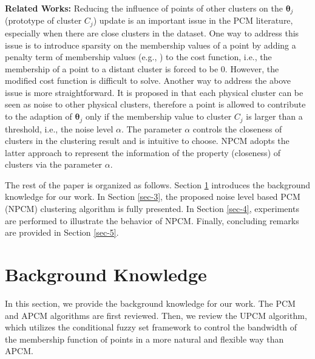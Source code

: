\documentclass[conference]{IEEEtran}
\theoremstyle{definition}
\begin{document}
\textbf{Related Works:}
Reducing the influence of points of other clusters on the $\boldsymbol{\theta}_j$ (prototype of cluster $C_j$) update is an important issue in the PCM literature, especially when there are close clusters in the dataset. One way to address this issue is to introduce sparsity on the membership values of a point by adding a penalty term of membership values (e.g., \cite{inokuchi_sparse_2007}\cite{xenaki_sparsity-aware_2016}) to the cost function, i.e., the membership of a point to a distant cluster is forced to be $0$. However, the modified cost function is difficult to solve. Another way to address the above issue is more straightforward. It is proposed in \cite{hou_pcm_2016} that each physical cluster can be seen as noise to other physical clusters, therefore a point is allowed to contribute to the adaption of $\boldsymbol{\theta}_j$ only if the membership value to cluster $C_j$ is larger than a threshold, i.e., the noise level $\alpha$. The parameter $\alpha$ controls the closeness of clusters in the clustering result and is intuitive to choose. NPCM adopts the latter approach to represent the information of the property (closeness) of clusters via the parameter $\alpha$.

The rest of the paper is organized as follows. Section \ref{sec-2} introduces the background knowledge for our work. In Section \ref{sec-3}, the proposed noise level based PCM (NPCM) clustering algorithm is fully presented. In Section \ref{sec-4}, experiments are performed to illustrate the behavior of NPCM. Finally, concluding remarks are provided in Section \ref{sec-5}.
\section{Background Knowledge}
\label{sec-2}
In this section, we provide the background knowledge for our work. The PCM and APCM algorithms are first reviewed. Then, we review the UPCM algorithm, which utilizes the conditional fuzzy set framework to control the bandwidth of the membership function of points in a more natural and flexible way than APCM.
\end{document}

